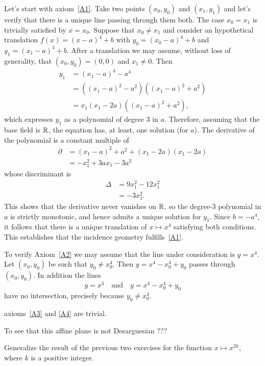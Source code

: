 \begin{solution}
    Let's start with axiom~\ref{A1}. Take two points $(x_0,y_0)$ and $(x_1,y_1)$ and let's verify that there is a unique line passing through them both. The case $x_0=x_1$ is trivially satisfied by $x=x_0$. Suppose that $x_0\ne x_1$ and consider an hypothetical translation $f(x)=(x-a)^4+b$ with $y_0=(x_0-a)^4+b$ and $y_1=(x_1-a)^4+b$. After a translation we may assume, without loss of generality, that $(x_0,y_0)=(0,0)$ and $x_1\ne0$. Then
    \begin{align*}
        y_1 &= (x_1-a)^4-a^4\\
            &= ((x_1-a)^2-a^2)((x_1-a)^2+a^2)\\
            &= x_1(x_1-2a)((x_1-a)^2+a^2),
    \end{align*}
    which expresses $y_1$ as a polynomial of degree $3$ in $a$. Therefore, assuming that the base field is $\mathbb{R}$, the equation has, at least, one solution (for $a$). The derivative of the \rhs polynomial is a constant multiple of
    \begin{align*}
        \partial &= (x_1-a)^2+a^2+(x_1-2a)(x_1-2a)\\
        &= -x_1^2 + 3ax_1 - 3a^2
    \end{align*}
    whose discriminant is
    \begin{align*}
        \Delta &= 9x_1^2-12x_1^2\\
            &= -3x_1^2.
    \end{align*}
    This shows that the derivative never vanishes on\/ $\mathbb{R}$, so the degree-$3$ polynomial in\/ $a$ is strictly monotonic, and hence admits a unique solution for\/ $y_1$. Since\/ $b=-a^4$, it follows that there is a unique translation of\/ $x \mapsto x^4$ satisfying both conditions. This establishes that the incidence geometry fulfills~\ref{A1}.

    To verify Axiom~\ref{A2} we may assume that the line under consideration is $y=x^4$. Let $(x_0,y_0)$ be such that $y_0\ne x_0^4$. Then $y=x^4-x_0^4+y_0$ passes through $(x_0,y_0)$. In addition the lines
    $$
        y = x^4\quad\text{and}\quad y = x^4-x_0^4+y_0
    $$
    have no intersection, precisely because $y_0\ne x_0^4$.

    axioms~\ref{A3} and \ref{A4} are trivial.

    To see that this affine plane is not Desarguesian ???

\end{solution}

\begin{exr}
    Generalize the result of the previous two exercises for the function\/ $x \mapsto x^{2k}$, where\/ $k$ is a positive integer.
\end{exr}

